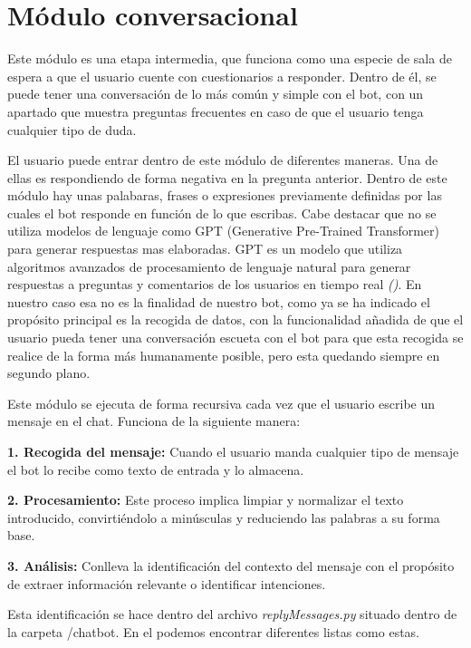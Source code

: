 \section{Módulo conversacional}

Este módulo es una etapa intermedia, que funciona como una especie de sala de espera a que el usuario cuente con cuestionarios a responder. Dentro de él, se puede tener una conversación de lo más común y simple con el bot, con un apartado que muestra preguntas frecuentes en caso de que el usuario tenga cualquier tipo de duda. 

El usuario puede entrar dentro de este módulo de diferentes maneras. Una de ellas es respondiendo de forma negativa en la pregunta anterior. Dentro de este módulo hay unas palabaras, frases o expresiones previamente definidas por las cuales el bot responde en función de lo que escribas. Cabe destacar que no se utiliza modelos de lenguaje como GPT (Generative Pre-Trained Transformer) para generar respuestas mas elaboradas. GPT es un modelo que utiliza algoritmos avanzados de procesamiento de lenguaje natural para generar respuestas a preguntas y comentarios de los usuarios en tiempo real \textit{(\cite{gpt2020})}. En nuestro caso esa no es la finalidad de nuestro bot, como ya se ha indicado el propósito principal es la recogida de datos, con la funcionalidad añadida de que el usuario pueda tener una conversación escueta con el bot para que esta recogida se realice de la forma más humanamente posible, pero esta quedando siempre en segundo plano. 

Este módulo se ejecuta de forma recursiva cada vez que el usuario escribe un mensaje en el chat. Funciona de la siguiente manera:\vspace{0.3cm}

\textbf{1. Recogida del mensaje: }Cuando el usuario manda cualquier tipo de mensaje el bot lo recibe como texto de entrada y lo almacena.\vspace{0.3cm}

\textbf{2. Procesamiento: }Este proceso implica limpiar y normalizar el texto introducido, convirtiéndolo a minúsculas y reduciendo las palabras a su forma base. \vspace{0.3cm}

\textbf{3. Análisis: }Conlleva la identificación del contexto del mensaje con el propósito de extraer información relevante o identificar intenciones. 

Esta identificación se hace dentro del archivo \textit{replyMessages.py} situado dentro de la carpeta /chatbot. En el podemos encontrar diferentes listas como estas.\vspace{1cm}


